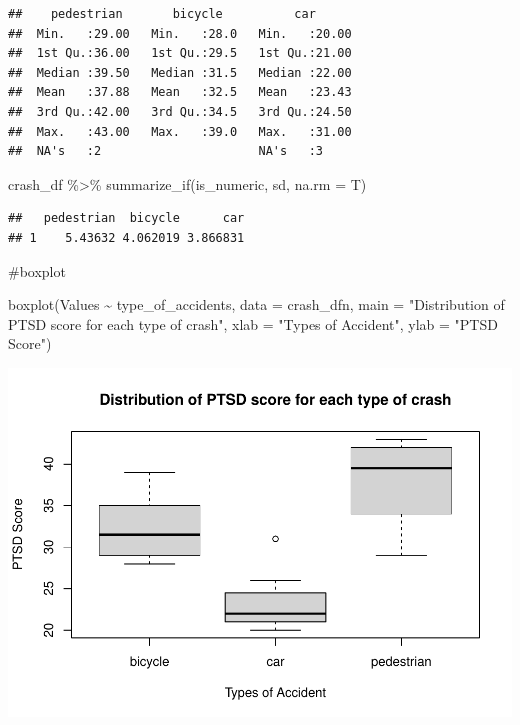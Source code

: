 \documentclass[
]{article}
\newenvironment{Shaded}{\begin{snugshade}}{\end{snugshade}}
\newcommand{\AttributeTok}[1]{\textcolor[rgb]{0.77,0.63,0.00}{#1}}
\newcommand{\FunctionTok}[1]{\textcolor[rgb]{0.00,0.00,0.00}{#1}}
\newcommand{\NormalTok}[1]{#1}
\newcommand{\SpecialCharTok}[1]{\textcolor[rgb]{0.00,0.00,0.00}{#1}}
\newcommand{\StringTok}[1]{\textcolor[rgb]{0.31,0.60,0.02}{#1}}
\begin{document}
\begin{verbatim}
##    pedestrian       bicycle          car       
##  Min.   :29.00   Min.   :28.0   Min.   :20.00  
##  1st Qu.:36.00   1st Qu.:29.5   1st Qu.:21.00  
##  Median :39.50   Median :31.5   Median :22.00  
##  Mean   :37.88   Mean   :32.5   Mean   :23.43  
##  3rd Qu.:42.00   3rd Qu.:34.5   3rd Qu.:24.50  
##  Max.   :43.00   Max.   :39.0   Max.   :31.00  
##  NA's   :2                      NA's   :3
\end{verbatim}

\begin{Shaded}
\begin{Highlighting}[]
\NormalTok{crash\_df }\SpecialCharTok{\%\textgreater{}\%} \FunctionTok{summarize\_if}\NormalTok{(is\_numeric, sd, }\AttributeTok{na.rm =}\NormalTok{ T)}
\end{Highlighting}
\end{Shaded}

\begin{verbatim}
##   pedestrian  bicycle      car
## 1    5.43632 4.062019 3.866831
\end{verbatim}

\#boxplot

\begin{Shaded}
\begin{Highlighting}[]
\FunctionTok{boxplot}\NormalTok{(Values }\SpecialCharTok{\textasciitilde{}}\NormalTok{ type\_of\_accidents, }\AttributeTok{data =}\NormalTok{ crash\_dfn,}
        \AttributeTok{main =} \StringTok{"Distribution of PTSD score for each type of crash"}\NormalTok{,}
        \AttributeTok{xlab =} \StringTok{"Types of Accident"}\NormalTok{,}
        \AttributeTok{ylab =} \StringTok{"PTSD Score"}\NormalTok{)}
\end{Highlighting}
\end{Shaded}

\includegraphics{HW4-tk2886-_files/figure-latex/unnamed-chunk-5-1.pdf}
\end{document}
